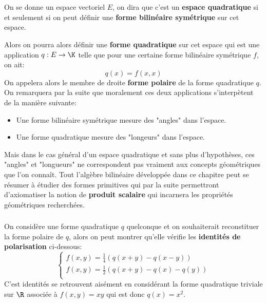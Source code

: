 \chapter*{}
On se donne un espace vectoriel \(E\), on dira que c'est un \textbf{espace quadratique} si et seulement si on peut définir une \textbf{forme bilinéaire symétrique} sur cet espace.\<

Alors on pourra alors définir une \textbf{forme quadratique} sur cet espace qui est une application \(q : E \rightarrow \K\) telle que pour une certaine forme bilinéaire symétrique \(f\), on ait:
\[
   q(x) = f(x, x)   
\]
On appelera alors le membre de droite \textbf{forme polaire} de la forme quadratique \(q\). On remarquera par la suite que moralement ces deux applications s'interpètent de la manière suivante:
\begin{itemize}
   \item Une forme bilinéaire symétrique mesure des "angles" dans l'espace.
   \item Une forme quadratique mesure des "longeurs" dans l'espace.
\end{itemize}
Mais dans le cas général d'un espace quadratique et sans plus d'hypothèses, ces "angles" et "longueurs" ne correspondent pas vraiment aux concepts géométriques que l'on connaît. Tout l'algèbre bilinéaire développée dans ce chapitre peut se résumer à étudier des formes primitives qui par la suite permettront d'axiomatiser la notion de \textbf{produit scalaire} qui incarnera les propriétés géométriques recherchées. 

\subsection*{}
On considère une forme quadratique \(q\) quelconque et on souhaiterait reconstituer la forme polaire de \(q\), alors on peut montrer qu'elle vérifie les \textbf{identités de polarisation} ci-dessous:
\[
   \begin{cases}
      f(x, y) = \frac{1}{4}(q(x + y) - q(x - y))\\
      f(x, y) = \frac{1}{2}(q(x + y) - q(x) - q(y))\\
   \end{cases}   
\]
C'est identités se retrouvent aisément en considérant la forme quadratique triviale sur \(\R\) associée à \(f(x, y) = xy\) qui est donc \(q(x) = x^2\).
